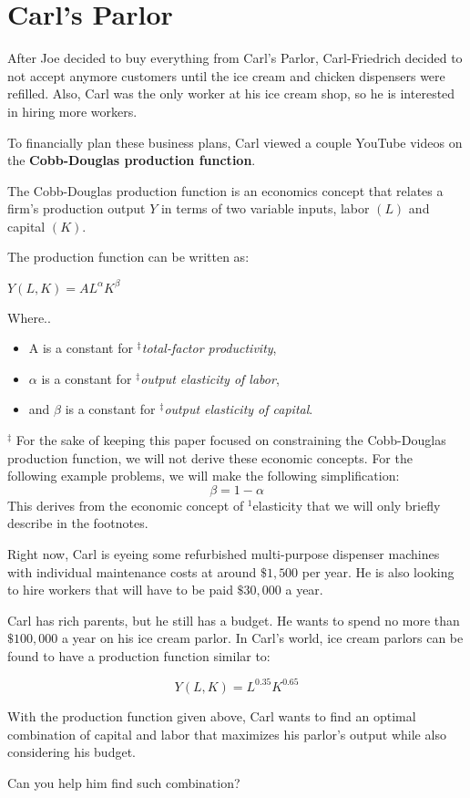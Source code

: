 \setcounter{chapter}{8}
\chapter{Carl's Parlor}
After Joe decided to buy everything from Carl's Parlor, Carl-Friedrich decided to not accept anymore customers until the ice cream and chicken dispensers were refilled.
Also, Carl was the only worker at his ice cream shop, so he is interested in hiring more workers.

To financially plan these business plans, Carl viewed a couple YouTube videos on the \textbf{Cobb-Douglas production function}.
\begin{remark}
	The Cobb-Douglas production function is an economics concept that relates a firm's production output $Y$ in terms of two variable inputs, labor $(L)$ and capital $(K)$.

	The production function can be written as:
	\begin{center}
		$Y(L, K) = AL^{\alpha}K^{\beta}$
	\end{center}
	Where..
	\begin{itemize}
		\item A is a constant for \textit{$^\ddagger$total-factor productivity},
		\item $\alpha$ is a constant for \textit{$^\ddagger$output elasticity of labor},
		\item and $\beta$ is a constant for \textit{$^\ddagger$output elasticity of capital}.
	\end{itemize}

	$^\ddagger$ For the sake of keeping this paper focused on constraining the Cobb-Douglas production function, we will not derive these economic concepts.
	For the following example problems, we will make the following simplification: \[\beta = 1 - \alpha\]
	This derives from the economic concept of $^1$elasticity that we will only briefly describe in the footnotes.%
\end{remark}

Right now, Carl is eyeing some refurbished multi-purpose dispenser machines with individual maintenance costs at around $\$1,500$ per year.
He is also looking to hire workers that will have to be paid $\$30,000$ a year.

Carl has rich parents, but he still has a budget.
He wants to spend no more than $\$100,000$ a year on his ice cream parlor.
In Carl's world, ice cream parlors can be found to have a production function similar to:\par
\LARGE
\begin{equation}
	Y(L, K) = L^{0.35}K^{0.65}
\end{equation}
\normalsize
\begin{eg}
	With the production function given above, Carl wants to find an optimal combination of capital and labor that maximizes his parlor's output while also considering his budget.

	Can you help him find such combination?
\end{eg}
\setcounter{chapter}{9}
